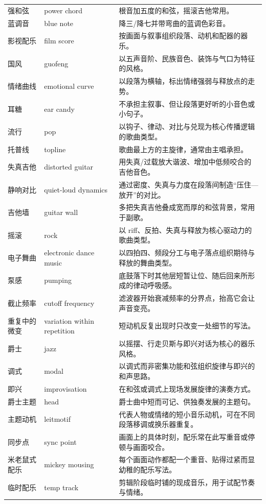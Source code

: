 \begin{longtable}{p{}p{}p{}}
强和弦 & power chord & 根音加五度的和弦，摇滚吉他常用。 \\
蓝调音 & blue note & 降三/降七并带弯曲的蓝调色彩音。 \\
影视配乐 & film score & 按画面与叙事组织段落、动机和配器的器乐。 \\
国风 & guofeng & 以五声音阶、民族音色、装饰与气口为特征的风格。 \\
情绪曲线 & emotional curve & 以段落为横轴，标出情绪强弱与释放点的走势。 \\
耳糖 & ear candy & 不承担主叙事、但让段落更好听的小音色或小句子。 \\
流行 & pop & 以钩子、律动、对比与兑现为核心传播逻辑的歌曲类型。 \\
托普线 & topline & 歌曲最上方的主旋律，通常由主唱承担。 \\
失真吉他 & distorted guitar & 用失真/过载放大谐波、增加中低频咬合的吉他音色。 \\
静响对比 & quiet-loud dynamics & 通过密度、失真与力度在段落间制造“压住—放开”的对比。 \\
吉他墙 & guitar wall & 多把失真吉他叠成宽而厚的和弦背景，常用于副歌。 \\
摇滚 & rock & 以 riff、反拍、失真与释放为核心驱动力的歌曲类型。 \\
电子舞曲 & electronic dance music & 以四拍四、频段分工与电子落点组织期待与释放的舞曲类型。 \\
泵感 & pumping & 底鼓落下时其他层短暂让位、随后回来所形成的律动呼吸感。 \\
截止频率 & cutoff frequency & 滤波器开始衰减频率的分界点，抬高它会让声音变亮。 \\
重复中的微变 & variation within repetition & 短动机反复出现时只改变一处细节的写法。 \\
爵士 & jazz & 以摇摆、行走贝斯与即兴对话为核心的器乐风格。 \\
调式 & modal & 以调式而非密集功能和弦组织旋律与即兴的和声思路。 \\
即兴 & improvisation & 在和弦或调式上现场发展旋律的演奏方式。 \\
爵士主题 & head & 爵士曲中短而可记、供独奏发展的主题句。 \\
主题动机 & leitmotif & 代表人物或情绪的短小音乐动机，可在不同段落移调或换乐器重复。 \\
同步点 & sync point & 画面上的具体时刻，配乐常在此写重音或停顿与画面咬合。 \\
米老鼠式配乐 & mickey mousing & 每个画面动作都配一个重音、贴得过紧而显幼稚的配乐写法。 \\
临时配乐 & temp track & 剪辑阶段临时铺的现成音乐，用于试配节奏与情绪。 \\
\bottomrule
\end{longtable}

